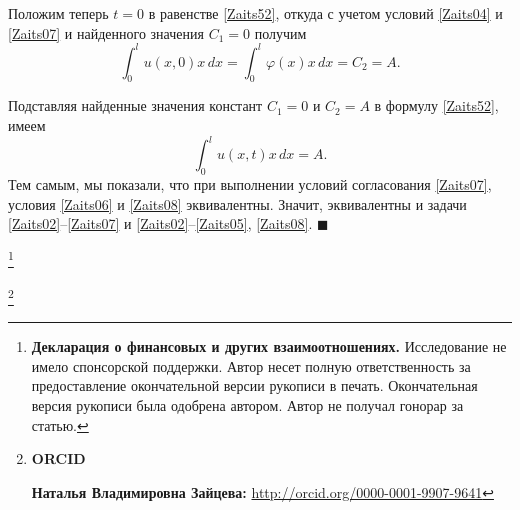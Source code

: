 Положим теперь $t=0$ в равенстве \eqref{Zaits52}, откуда с учетом условий \eqref{Zaits04} и \eqref{Zaits07} и найденного значения $C_1=0$ получим
$$ \int _0^lu(x,0)x\,dx= \int _0^l\varphi(x)x\,dx=C_2=A.$$

Подставляя найденные значения констант $C_1=0$ и $C_2=A$ в формулу \eqref{Zaits52}, имеем
\begin{equation}
\label{Zaits53}
 \int _0^lu(x,t)x\,dx=A.
\end{equation}
Тем самым, мы показали, что при выполнении условий согласования \eqref{Zaits07}, условия \eqref{Zaits06} и \eqref{Zaits08} эквивалентны. Значит, эквивалентны и задачи \eqref{Zaits02}--\eqref{Zaits07} и \eqref{Zaits02}--\eqref{Zaits05}, \eqref{Zaits08}. $\blacksquare$


\thanks{{\bf Декларация о финансовых и других взаимоотношениях.}
Исследование не имело спонсорской поддержки.
Автор несет полную ответственность за предоставление окончательной версии рукописи в печать.
Окончательная версия рукописи была одобрена автором.
Автор не получал гонорар за статью.
}

\thanks{{\bf ORCID}

{\bf Наталья Владимировна Зайцева:} \url{http://orcid.org/0000-0001-9907-9641}

}


\RusRef

